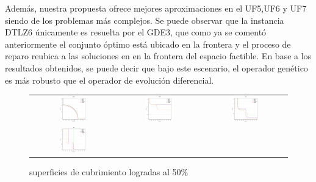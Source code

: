 Además, nuestra propuesta ofrece mejores aproximaciones en el UF5,UF6 y UF7 siendo de los problemas más complejos.
%
Se puede observar que la instancia DTLZ6 únicamente es resuelta por el GDE3, que como ya se comentó anteriormente el conjunto óptimo está ubicado en la frontera y el proceso de reparo reubica a las soluciones en en la frontera del espacio factible.
%
En base a los resultados obtenidos, se puede decir que bajo este escenario, el operador genético es más robusto que el operador de evolución diferencial.
%

\begin{figure}[H]
\caption{superficies de cubrimiento logradas al 50\%}%
\label{fig:Superficies_cubrimiento_VSD_MOEA}
\begin{tabular}{ccc}
  \includegraphics[width=0.33\textwidth]{Figures_Chapter7/Results_Chapter3/DTLZ6.eps}  &
  \includegraphics[width=0.33\textwidth]{Figures_Chapter7/Results_Chapter3/DTLZ7.eps} &
  \includegraphics[width=0.33\textwidth]{Figures_Chapter7/Results_Chapter3/UF5.eps} \\
  \includegraphics[width=0.33\textwidth]{Figures_Chapter7/Results_Chapter3/UF6.eps} &

\end{tabular}
\end{figure}
